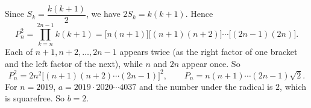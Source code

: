 Since $S_k=\dfrac{k(k+1)}{2}$, we have $2S_k=k(k+1)$. Hence
\[P_n^2=\prod_{k=n}^{2n-1}k(k+1)=\bigl[n(n+1)\bigr]\bigl[(n+1)(n+2)\bigr]\cdots\bigl[(2n-1)(2n)\bigr].\]
Each of $n+1,n+2,\dots,2n-1$ appears twice (as the right factor of one bracket and the left factor of the next), while $n$ and $2n$ appear once. So
\[P_n^2=2n^2\bigl[(n+1)(n+2)\cdots(2n-1)\bigr]^2,\qquad P_n=n(n+1)\cdots(2n-1)\sqrt2.\]
For $n=2019$, $a=2019\cdot2020\cdots4037$ and the number under the radical is $2$, which is squarefree. So $b=\boxed{2}$.
